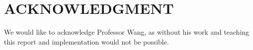 \documentclass[letterpaper, 10 pt, conference]{ieeeconf}   %
\begin{document}






\section*{ACKNOWLEDGMENT}

We would like to acknowledge Professor Wang, as without his work and teaching this report and implementation would not be possible.




\end{document}

